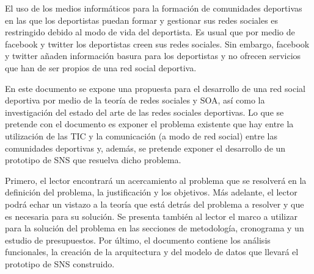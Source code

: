 El uso de los medios informáticos para la formación de comunidades deportivas en las que los deportistas puedan formar y gestionar sus redes sociales es restringido debido al modo de vida del deportista. Es usual que por medio de facebook y twitter los deportistas creen sus redes sociales. Sin embargo, facebook y twitter añaden información basura para los deportistas y no ofrecen servicios que han de ser propios de una red social deportiva.

En este documento se expone una propuesta para el desarrollo de una red social deportiva por medio de la teoría de redes sociales y SOA, así como la investigación del estado del arte de las redes sociales deportivas. Lo que se pretende con el documento es exponer el problema existente que hay entre la utilización de las TIC y la comunicación (a modo de red social) entre las comunidades deportivas y, además, se pretende exponer el desarrollo de un prototipo de SNS que resuelva dicho problema.

Primero, el lector encontrará un acercamiento al problema que se resolverá en la definición del problema, la justificación y los objetivos. Más adelante, el lector podrá echar un vistazo a la teoría que está detrás del problema a resolver y que es necesaria para su solución. Se presenta también al lector el marco a utilizar para la solución del problema en las secciones de metodología, cronograma y un estudio de presupuestos. Por último, el documento contiene los análisis funcionales, la creación de la arquitectura y del modelo de datos que llevará el prototipo de SNS construido.
